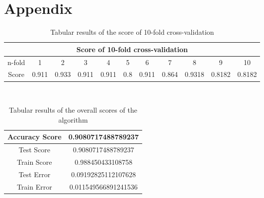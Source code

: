 \section*{Appendix}
\label{Appendix Section}

\begin{table}[H]
    \begin{center}
     \footnotesize
     \begin{tabular}{|c||c|c|c|c|c|c|c|c|c|c|}
     \hline
     \multicolumn{11}{|c|}{Score of 10-fold cross-validation} \\
     \hline \hline
     n-fold & 1 & 2 & 3 & 4 & 5 & 6 & 7 & 8 & 9 & 10 \\
     \hline
     Score & 0.911& 0.933 &0.911 &0.911 &0.8 & 0.911&0.864 &0.9318 &0.8182 &0.8182 \\
     \hline
     \end{tabular} \\ 
     \caption{Tabular results of the score of 10-fold cross-validation}
     \label{10fold score}
    \end{center}
\end{table}

    \begin{table}[H]
        \begin{center}
         \footnotesize
         \begin{tabular}{|c||c|}
         \hline
         Accuracy Score& 0.9080717488789237 \\
         \hline
         Test Score & 0.9080717488789237\\
         \hline
         Train Score& 0.988450433108758\\
         \hline
         Test Error& 0.09192825112107628\\
         \hline
         Train Error&0.011549566891241536\\
         \hline
         \end{tabular} \\ 
         \caption{Tabular results of the overall scores of the algorithm}
         \label{scores}
        \end{center}
    \end{table}

